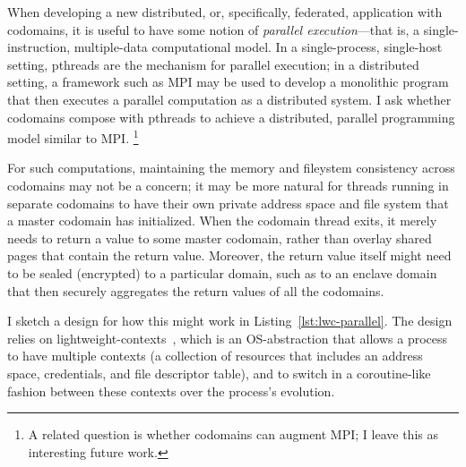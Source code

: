 %
%
When developing a new distributed, or, specifically, federated, application
with codomains, it is useful to have some notion of \emph{parallel
execution}---that is, a single-instruction, multiple-data computational model.
%
In a single-process, single-host setting, pthreads are the mechanism for
parallel execution; in a distributed setting, a framework such as MPI
may be used to develop a monolithic program that then executes a parallel
computation as a distributed system.
%
I ask whether codomains compose with pthreads to achieve a distributed,
parallel programming model similar to MPI.  \footnote{A related question is
whether codomains can augment MPI; I leave this as interesting future work.
}


For such computations, maintaining the memory and fileystem consistency across
codomains may not be a concern; it may be more natural for threads running in
separate codomains to have their own private address space and file system that
a master codomain has initialized.
%
When the codomain thread exits, it merely needs to return a value to some
master codomain, rather than overlay shared pages that contain the return
value.
%
%
Moreover, the return value itself might need to be sealed (encrypted) to a
particular domain, such as to an enclave domain that then securely aggregates
the return values of all the codomains.


I sketch a design for how this might work in Listing~\ref{lst:lwc-parallel}.
%
The design relies on lightweight-contexts~\cite{lwcs}, which is an
OS-abstraction that allows a process to have multiple contexts (a collection of
resources that includes an address space, credentials, and file descriptor table),
and to switch in a coroutine-like fashion between these contexts over the
process's evolution.
%



